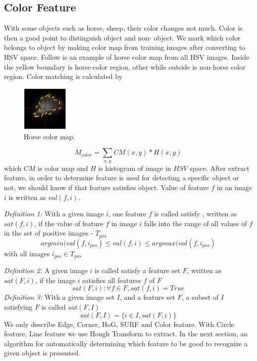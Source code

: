 \subsection{Color Feature}
With some objects such as horse, sheep,
their color changes not much. Color is then
a good point to distinguish object and non-
object. We mark which color belongs to
object by making color map from training
images after converting to HSV space.
Follow is an example of horse color map
from all HSV images. Inside the yellow
boundary is horse-color region, other
while outside is non-horse color region.
Color matching is calculated by
\begin{figure}[ht]
  \centering
  \includegraphics[width=0.90in]{images/colormap.jpg}
  \caption{Horse color map.}
  \label{fig:horse_color}
\end{figure}
\begin{equation}
   M_{color} = \sum_{x,y} CM(x,y) * H(x,y)
   \label{eq:color}
\end{equation}
which $CM$ is color map and $H$ is histogram of image in $HSV$ space.
After extract feature, in order to determine feature is used for
detecting a specific object or not, we should know if that feature
satisfies object. Value of feature $f$ in an image $i$ is written as $val(f,i)$.

\textit{Definition 1:} With a given image $i$, one feature $f$ is called satisfy ,
written as $sat(f,i)$, if the value of feature $f$ in image $i$ falls into the range of all
values of $f$ in the set of positive images - $T_{pos}$
\begin{equation}
   {argmin}(val(f,i_{pos}) \leq val(f,i) \leq {argmax} (val(f,i_{pos})
   \label{eq:sat_f}
\end{equation}
with all images $i_{pos} \in T_{pos}$

\textit{Definition 2:} A given image $i$ is called satisfy a feature set $F$,
written as $sat(F,i)$, if the image $i$ satisfies all features $f$ of $F$
\begin{equation}
   sat(F,i): \forall f \in F, sat(f,i) = True
   \label{eq:sat_F}
\end{equation}
\textit{Definition 3:} With a given image set $I$, and a feature set $F$, a subset of $I$ satisfying $F$ is called $sat(F,I)$ 
\begin{equation}
   sat(F,I) = \{i \in I, sat(F,i)\}
   \label{eq:sat_F_I}
\end{equation}
We only describe Edge, Corner, HoG, SURF and Color feature.
With Circle feature, Line feature we use Hough Transform to extract. In the next section, an algorithm for automatically determining which feature to be good to recognize a given object is presented.





